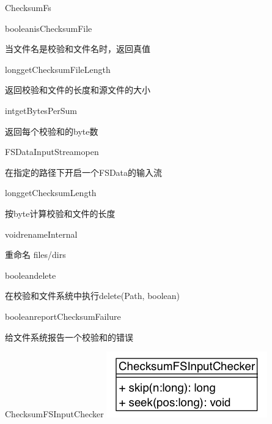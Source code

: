 \begin{XeClass}{ChecksumFs}
    \begin{XeMethod}{\XePublic}{boolean}{isChecksumFile}
         
 当文件名是校验和文件名时，返回真值

    \end{XeMethod}

    \begin{XeMethod}{\XePublic}{long}{getChecksumFileLength}
         
 返回校验和文件的长度和源文件的大小

    \end{XeMethod}

    \begin{XeMethod}{\XePublic}{int}{getBytesPerSum}
         
 返回每个校验和的byte数

    \end{XeMethod}

    \begin{XeMethod}{\XePublic}{FSDataInputStream}{open}
         
 在指定的路径下开启一个FSData的输入流

    \end{XeMethod}

    \begin{XeMethod}{\XePublic}{long}{getChecksumLength}
         
 按byte计算校验和文件的长度

    \end{XeMethod}

    \begin{XeMethod}{\XePublic}{void}{renameInternal}
         
 重命名 files/dirs

    \end{XeMethod}

    \begin{XeMethod}{\XePublic}{boolean}{delete}
         
 在校验和文件系统中执行delete(Path, boolean)

    \end{XeMethod}

    \begin{XeMethod}{\XePublic}{boolean}{reportChecksumFailure}
         
 给文件系统报告一个校验和的错误

    \end{XeMethod}

    \begin{XeInnerClass}{ChecksumFSInputChecker}
\includegraphics[width=\textwidth]{cdig/ChecksumFSInputChecker.png}
         

\end{XeInnerClass}
\end{XeClass}
